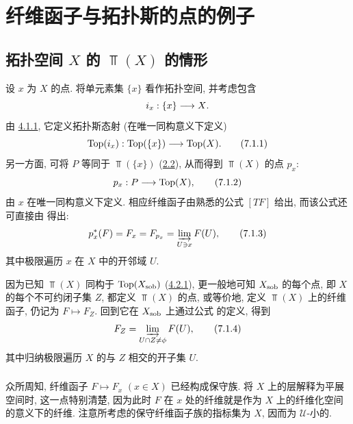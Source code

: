 

\section{纤维函子与拓扑斯的点的例子}\pageoriginale

\subsection{拓扑空间 $X$ 的 $\Top(X)$ 的情形}

设 $x$ 为 $X$ 的点. 将单元素集 $\{x\}$ 看作拓扑空间, 并考虑包含
$$
i_x:\{x\}\longrightarrow X{}.
$$
由 \hyperref[IV.subsubsec4.1.1]{4.1.1}, 它定义拓扑斯态射 (在唯一同构意义下定义)
\begin{equation*}
\operatorname{Top}(i_x):\operatorname{Top}(\{x\})\longrightarrow \operatorname{Top}(X){}.\tag{7.1.1}
\end{equation*}
另一方面, 可将 $P$ 等同于 $\Top(\{x\})$ (\hyperref[IV.subsec2.2]{2.2}), 从而得到 $\Top(X)$ 的点 $p_x$:
\begin{equation*}
p_x:P\longrightarrow \operatorname{Top}(X){},\tag{7.1.2}
\end{equation*}
由 $x$ 在唯一同构意义下定义. 相应纤维函子由熟悉的公式 $[TF]$ 给出, 而该公式还可直接由  得出:
\begin{equation*}
p^{\ast}_x(F)=F_x=F_{p_x}=\varinjlim_{U\ni x}F(U){},\tag{7.1.3}
\end{equation*}
其中极限遍历 $x$ 在 $X$ 中的开邻域 $U$.

因为已知 $\Top(X)$ 同构于 $\operatorname{Top}(X_{\operatorname{sob}})$ (\hyperref[IV.subsubsec4.2.1]{4.2.1}), 更一般地可知 $X_{\operatorname{sob}}$ 的每个点, 即 $X$ 的每个不可约闭子集 $Z$, 都定义 $\Top(X)$ 的点, 或等价地, 定义 $\Top(X)$ 上的纤维函子, 仍记为 $F\mapsto F_Z$. 回到它在 $X_{\operatorname{sob}}$ 上通过公式  的定义, 得到
\begin{equation*}
F_Z=\varinjlim_{U\cap Z\neq \phi} F(U){},\tag{7.1.4}
\end{equation*}
其中\pageoriginale 归纳极限遍历 $X$ 的与 $Z$ 相交的开子集 $U$.

\setcounter{subsubsection}{4}
\subsubsection{}
众所周知, 纤维函子 $F\mapsto F_x$ $(x\in X)$ 已经构成保守族. 将 $X$ 上的层解释为平展空间时, 这一点特别清楚, 因为此时 $F$ 在 $x$ 处的纤维就是作为 $X$ 上的纤维化空间的意义下的纤维. 注意所考虑的保守纤维函子族的指标集为 $X$, 因而为 $𝒰$-小的.

